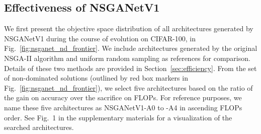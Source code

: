 \documentclass[journal]{IEEEtran}
\def\ourmethod{NSGANetV1}
\theoremstyle{definition}
\theoremstyle{remark}
\begin{document}
\begin{table}[t]
\centering
\caption{Summary of Hyper-parameter Settings.}
\label{tab:hyper-params}
\end{table}

\vspace{-2mm}
\subsection{Effectiveness of \ourmethod{}\label{sec:effectiveness}}
We first present the objective space distribution of all architectures generated by \ourmethod{} during the course of evolution on CIFAR-100, in Fig.~\ref{fig:nsganet_nd_frontier}. We include architectures generated by the original NSGA-II algorithm and uniform random sampling as references for comparison. Details of these two methods are provided in Section~\ref{sec:efficiency}. From the set of non-dominated solutions (outlined by red box markers in Fig.~\ref{fig:nsganet_nd_frontier}), we select five architectures based on the ratio of the gain on accuracy over the sacrifice on FLOPs. For reference purposes, we name these five architectures as \ourmethod{}-A0 to -A4 in ascending FLOPs order. See Fig.~1 in the supplementary materials for a visualization of the searched architectures.
\end{document}
